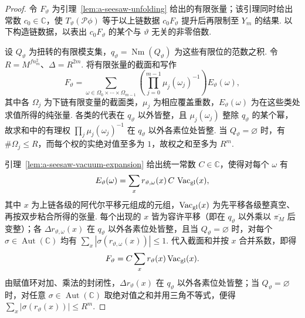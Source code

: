 \begin{proof}
令 $F_\vartheta$ 为引理~\ref{lem:a-seesaw-unfolding} 给出的有限张量；该引理同时给出常数 $c_0\in\mathbb C$，使 $T_\vartheta(\mathcal P\phi)$ 等于以上链数据 $c_0F_\vartheta$ 提升后再限制至 $Y_m$ 的结果. 以下构造链数据，以表出 $c_0F_\vartheta$ 的某个与 $\vartheta$ 无关的非零倍数.

设 $Q_\vartheta$ 为扭转的有限模支集，$q_\vartheta=\operatorname{Nm}(Q_\vartheta)$ 为这些有限位的范数之积. 令 $R=M^{f n_m^2}$、$\Delta=R^{2m}$. 将有限张量的截面和写作
\[
 F_\vartheta=\sum_{\omega\in\Omega_0\times\cdots\times\Omega_{m-1}}
             \left(\prod_{j=0}^{m-1}\mu_j(\omega_j)^{-1}\right)
             E_\vartheta(\omega),
\]
其中各 $\Omega_j$ 为下链有限变量的截面类，$\mu_j$ 为相应覆盖重数，$E_\vartheta(\omega)$ 为在这些类处求值所得的纯张量. 各类的代表在 $q_\vartheta$ 以外皆整，且 $\mu_j(\omega_j)$ 整除 $q_\vartheta$ 的某个幂，故求和中的有理权 $\prod_j\mu_j(\omega_j)^{-1}$ 在 $q_\vartheta$ 以外各素位处皆整. 当 $Q_\vartheta=\varnothing$ 时，有 $\#\Omega_j\le R$，而每个权的实绝对值至多为 $1$，故权之和至多为 $R^m$.

引理~\ref{lem:a-seesaw-vacuum-expansion} 给出统一常数 $C\in\mathbb C$，使得对每个 $\omega$ 有
\[
 E_\vartheta(\omega)=\sum_x r_{\vartheta,\omega}(x)\,
                         C\,\operatorname{Vac}_{\rm gl}(x),
\]
其中 $x$ 为上链各级的阿代尔平移元组成的元组，$\operatorname{Vac}_{\rm gl}(x)$ 为先平移各级整真空、再按双步粘合所得的张量. 每个出现的 $x$ 皆为容许平移（即在 $q_\vartheta$ 以外乘以 $\overline{\pi_M}$ 后变整）；各 $\Delta r_{\vartheta,\omega}(x)$ 在 $q_\vartheta$ 以外各素位处皆整，且当 $Q_\vartheta=\varnothing$ 时，对每个 $\sigma\in\operatorname{Aut}(\mathbb C)$ 均有
$\sum_x|\sigma(r_{\vartheta,\omega}(x))|\le1$.
代入截面和并按 $x$ 合并系数，即得
\[
 F_\vartheta=C\sum_x r_\vartheta(x)\operatorname{Vac}_{\rm gl}(x).
\]
由赋值环对加、乘法的封闭性，$\Delta r_\vartheta(x)$ 在 $q_\vartheta$ 以外各素位处皆整；当 $Q_\vartheta=\varnothing$ 时，对任意 $\sigma\in\operatorname{Aut}(\mathbb C)$ 取绝对值之和并用三角不等式，便得 $\sum_x|\sigma(r_\vartheta(x))|\le R^m$.


\end{proof}
